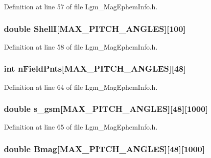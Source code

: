 Definition at line 57 of file Lgm\_\-MagEphemInfo.h.\hypertarget{struct_lgm___mag_ephem_info_9a29671c7d92f4a6fbbbf4caf6350b62}{
\subsubsection[{ShellI}]{\setlength{\rightskip}{0pt plus 5cm}double {\bf ShellI}\mbox{[}MAX\_\-PITCH\_\-ANGLES\mbox{]}\mbox{[}100\mbox{]}}}
\label{struct_lgm___mag_ephem_info_9a29671c7d92f4a6fbbbf4caf6350b62}




Definition at line 58 of file Lgm\_\-MagEphemInfo.h.\hypertarget{struct_lgm___mag_ephem_info_29cbea496fb314d5b004dd444cbe23a8}{
\subsubsection[{nFieldPnts}]{\setlength{\rightskip}{0pt plus 5cm}int {\bf nFieldPnts}\mbox{[}MAX\_\-PITCH\_\-ANGLES\mbox{]}\mbox{[}48\mbox{]}}}
\label{struct_lgm___mag_ephem_info_29cbea496fb314d5b004dd444cbe23a8}




Definition at line 64 of file Lgm\_\-MagEphemInfo.h.\hypertarget{struct_lgm___mag_ephem_info_fbd0f4250a5230950a688aa5fde2b8bc}{
\subsubsection[{s\_\-gsm}]{\setlength{\rightskip}{0pt plus 5cm}double {\bf s\_\-gsm}\mbox{[}MAX\_\-PITCH\_\-ANGLES\mbox{]}\mbox{[}48\mbox{]}\mbox{[}1000\mbox{]}}}
\label{struct_lgm___mag_ephem_info_fbd0f4250a5230950a688aa5fde2b8bc}




Definition at line 65 of file Lgm\_\-MagEphemInfo.h.\hypertarget{struct_lgm___mag_ephem_info_8b01c6142170f19b03a8dc496b9a3678}{
\subsubsection[{Bmag}]{\setlength{\rightskip}{0pt plus 5cm}double {\bf Bmag}\mbox{[}MAX\_\-PITCH\_\-ANGLES\mbox{]}\mbox{[}48\mbox{]}\mbox{[}1000\mbox{]}}}
\label{struct_lgm___mag_ephem_info_8b01c6142170f19b03a8dc496b9a3678}




